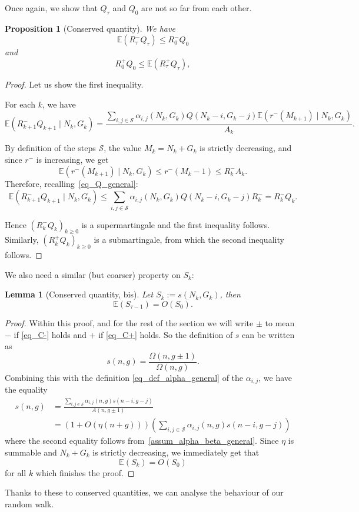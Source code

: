 \documentclass[a4paper,12pt]{article}
\newtheorem{lemma}[theorem]{Lemma}
\newtheorem{proposition}[theorem]{Proposition}
\theoremstyle{definition}
\newcommand{\EE}{\mathbb{E}}
\newcommand{\Sij}{\sum_{i,j\in\mathcal S}}
\newcommand{\bigO}[1]{O\left({#1}\right)}
\newcommand{\bigpar}[1]{\left({#1}\right)}
\begin{document}
Once again, we show that $Q_\tau$ and $Q_0$ are not so far from each other.

\begin{proposition}[Conserved quantity]
\label{prop_E(Q)_general}
We have 
\[\mathbb{E}(R^{-}_\tau Q_\tau) \leq R_0^{-}Q_0 \]
and
\[ R_0^{+}Q_0 \leq \mathbb{E}(R^{+}_{\tau}Q_\tau ),\]
\end{proposition}

\begin{proof}
Let us show the first inequality.

For each $k$, we have
\begin{equation}\label{eq_RQ_general}
    \EE(R^-_{k+1}Q_{k+1}\mid N_k,G_k)=\frac{\sum_{i,j\in \mathcal S}\alpha_{i,j}(N_k,G_k)Q(N_k-i,G_k-j)\EE(r^-(M_{k+1})\mid N_k,G_k)}{A_k}.
\end{equation}

By definition of the steps $\mathcal S$, the value $M_k = N_{k}+G_{k}$ is strictly decreasing, and since $r^-$ is increasing, we get
\[\EE(r^-(M_{k+1})\mid N_k,G_k)\leq r^-(M_k-1)\leq R^-_kA_k.\] 
Therefore, recalling~\eqref{eq_Q_general}:
\[\EE(R^-_{k+1}Q_{k+1}\mid N_k,G_k)\leq\sum_{i,j\in \mathcal S}\alpha_{i,j}(N_k,G_k)Q(N_k-i,G_k-j)R_k^-=R_k^-Q_k.\]

Hence $(R_k^-Q_k)_{k \geq 0}$ is a supermartingale and the first inequality follows. Similarly, $(R_k^+Q_k)_{k \geq 0}$ is a submartingale, from which the second inequality follows.

\end{proof}

We also need a similar (but coarser) property on $S_k$:

\begin{lemma}[Conserved quantity, bis]\label{lem_E(S)_general}
Let $S_k:=s(N_k,G_k)$, then
\[\mathbb{E}(S_{\tau-1})=\bigO{S_0}.\]
\end{lemma}

\begin{proof} Within this proof, and for the rest of the section we will write $\pm$ to mean $-$ if \eqref{eq_C-} holds and $+$ if \eqref{eq_C+} holds. So the definition of $s$ can be written as
\[s(n,g)=\frac{\Omega(n,g\pm1)}{\Omega(n,g)}.\]
Combining this with the definition \eqref{eq_def_alpha_general} of the $\alpha_{i,j}$, we have the equality
\begin{align*}
    s(n,g)&=\frac{\Sij \alpha_{i,j}(n,g)s(n-i,g-j)}{A(n,g\pm 1)}\\
    &=\bigpar{1+O(\eta(n+g))}\bigpar{\Sij \alpha_{i,j}(n,g)s(n-i,g-j)}
\end{align*}
where the second equality follows from~\cref{assum_alpha_beta_general}.
Since $\eta$ is summable and $N_k+G_k$ is strictly decreasing, we immediately get that
\[\mathbb{E}(S_k)=O(S_0)\]
for all $k$ which finishes the proof.

\end{proof}
Thanks to these to conserved quantities, we can analyse the behaviour of our random walk.
\end{document}
